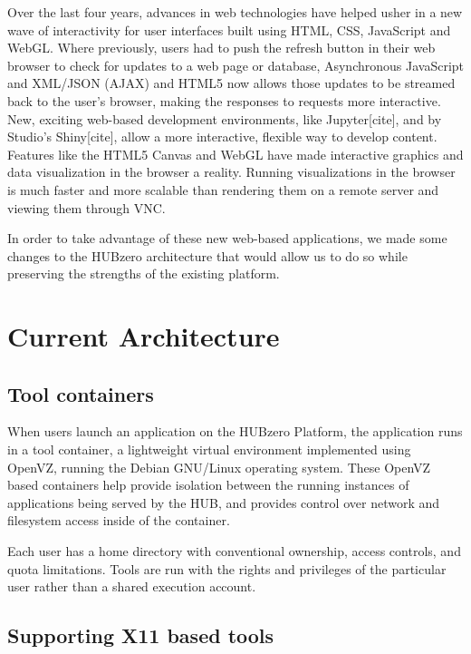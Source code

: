\documentclass[conference]{../sty/IEEEtran}
\begin{document}
Over the last four years, advances in web technologies have helped usher in a new wave of interactivity for user interfaces built using HTML, CSS, JavaScript and WebGL. Where previously, users had to push the refresh button in their web browser to check for updates to a web page or database, Asynchronous JavaScript and XML/JSON (AJAX) and HTML5 now allows those updates to be streamed back to the user’s browser, making the responses to requests more interactive. New, exciting web-based development environments, like Jupyter[cite], and by Studio's Shiny[cite], allow a more interactive, flexible way to develop content. Features like the HTML5 Canvas and WebGL have made interactive graphics and data visualization in the browser a reality.  Running visualizations in the browser is much faster and more scalable than rendering them on a remote server and viewing them through VNC.  

In order to take advantage of these new web-based applications, we made some changes to the HUBzero architecture that would allow us to do so while preserving the strengths of the existing platform. 

\section{Current Architecture}


\subsection {Tool containers}

When users launch an application on the HUBzero Platform, the application runs
in a tool container, a lightweight virtual environment implemented using
OpenVZ\cite{openvz}, running the Debian GNU/Linux operating system. These
OpenVZ based containers help provide isolation between the running instances of
applications being served by the HUB, and provides control over network and
filesystem access inside of the container.

Each user has a home directory with conventional ownership, access controls,
and quota limitations. Tools are run with the rights and privileges of the
particular user rather than a shared execution account.


\subsection {Supporting X11 based tools}
\end{document}

